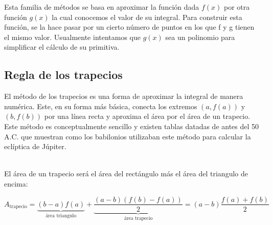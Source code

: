 \documentclass[12pt]{article}
\begin{document}
Esta familia de métodos se basa en aproximar la función dada $f(x)$ por otra función $g(x)$ la cual conocemos el valor de su integral. Para  construir esta función, se la hace pasar por un cierto número de puntos en los que f y g tienen el mismo valor. Usualmente intentamos que $g(x)$ sea un polinomio para simplificar el cálculo de su primitiva.
\subsection{Regla de los trapecios}

El método de los trapecios es una forma de aproximar la integral de manera numérica. Este, en su forma más básica, conecta los extremos $(a,f(a))$ y $(b,f(b))$ por una línea recta y aproxima el área por el área de un trapecio.
Este método es conceptualmente sencillo y existen tablas datadas de antes del 50 A.C. que muestran como los babilonios utilizaban este método para calcular la eclíptica de Júpiter.
\cite{babilonios}%

\\
    
    El área de un trapecio será el área del rectángulo más el área del triangulo de encima:
    
\begin{equation}\label{eq2}
A_{\text {trapecio}} = \underbrace{(b-a)f(a)}_{\text{área triangulo}} + \underbrace{\frac{(a-b)(f(b)-f(a))}{2}}_{\text{área trapecio}} = (a-b)\frac{f(a)+f(b)}{2}
\end{equation}
\end{document}
